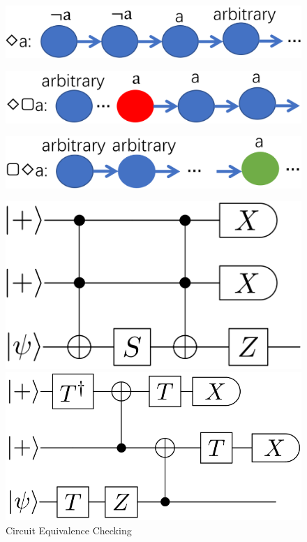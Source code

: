 \documentclass[aspectratio=1610,18pt]{ctexbeamer}
\begin{document}
\begin{frame}
  \begin{figure}
   \includegraphics[width=.6\textwidth]{eventually.png}
    \end{figure}
    \begin{figure}
      \includegraphics[width=.6\textwidth]{eventuallyalways.png}
       \end{figure}
       \begin{figure}
        \includegraphics[width=.6\textwidth]{alwayseventually.png}
         \end{figure}
\end{frame}
\begin{frame}
  \begin{figure}
    \centering
    \begin{minipage}{0.3\textwidth}
      \includegraphics[width=\textwidth]{rus1.png}
    \end{minipage}
    \quad
    \begin{minipage}{0.3\textwidth}
      \includegraphics[width=\textwidth]{rus2.png}
    \end{minipage}
    \caption{\Large Circuit Equivalence Checking}
  \end{figure}
\end{frame}
\end{document}
